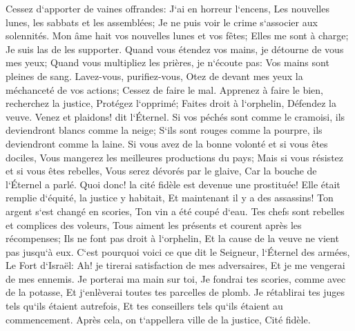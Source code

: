 \verse Cessez d`apporter de vaines offrandes: J`ai en horreur l`encens, Les nouvelles lunes, les sabbats et les assemblées; Je ne puis voir le crime s`associer aux solennités. 
\verse Mon âme hait vos nouvelles lunes et vos fêtes; Elles me sont à charge; Je suis las de les supporter. 
\verse Quand vous étendez vos mains, je détourne de vous mes yeux; Quand vous multipliez les prières, je n`écoute pas: Vos mains sont pleines de sang. 
\verse Lavez-vous, purifiez-vous, Otez de devant mes yeux la méchanceté de vos actions; Cessez de faire le mal. 
\verse Apprenez à faire le bien, recherchez la justice, Protégez l`opprimé; Faites droit à l`orphelin, Défendez la veuve. 
\verse Venez et plaidons! dit l`Éternel. Si vos péchés sont comme le cramoisi, ils deviendront blancs comme la neige; S`ils sont rouges comme la pourpre, ils deviendront comme la laine. 
\verse Si vous avez de la bonne volonté et si vous êtes dociles, Vous mangerez les meilleures productions du pays; 
\verse Mais si vous résistez et si vous êtes rebelles, Vous serez dévorés par le glaive, Car la bouche de l`Éternel a parlé. 
\verse Quoi donc! la cité fidèle est devenue une prostituée! Elle était remplie d`équité, la justice y habitait, Et maintenant il y a des assassins! 
\verse Ton argent s`est changé en scories, Ton vin a été coupé d`eau. 
\verse Tes chefs sont rebelles et complices des voleurs, Tous aiment les présents et courent après les récompenses; Ils ne font pas droit à l`orphelin, Et la cause de la veuve ne vient pas jusqu`à eux. 
\verse C`est pourquoi voici ce que dit le Seigneur, l`Éternel des armées, Le Fort d`Israël: Ah! je tirerai satisfaction de mes adversaires, Et je me vengerai de mes ennemis. 
\verse Je porterai ma main sur toi, Je fondrai tes scories, comme avec de la potasse, Et j`enlèverai toutes tes parcelles de plomb. 
\verse Je rétablirai tes juges tels qu`ils étaient autrefois, Et tes conseillers tels qu`ils étaient au commencement. Après cela, on t`appellera ville de la justice, Cité fidèle. 
